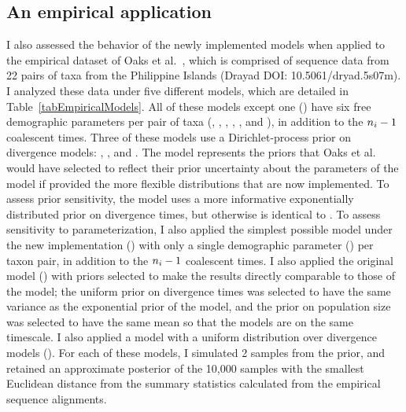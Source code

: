 \subsection{An empirical application}
I also assessed the behavior of the newly implemented models when applied to
the empirical dataset of Oaks et al.\ \cite{Oaks2012}, which is comprised of
sequence data from 22 pairs of taxa from the Philippine Islands (Drayad DOI:
10.5061/dryad.5s07m).
I analyzed these data under five different models, which are detailed in
Table~\ref{tabEmpiricalModels}.
All of these models except one (\empModelDPPSimple) have six free demographic
parameters per pair of taxa (\ancestralTheta{},
,
,
\bottleTime{},
, and
),
in addition to the $\popSampleSize{i}{} - 1$ coalescent times.
Three of these models use a Dirichlet-process prior on divergence models:
\empModelDPP, \empModelDPPInform, and \empModelDPPSimple.
The \empModelDPP model represents the priors that Oaks et al.\ \cite{Oaks2012}
would have selected to reflect their prior uncertainty about the parameters of
the model if provided the more flexible distributions that are now implemented.
To assess prior sensitivity, the \empModelDPPInform model uses a more
informative exponentially distributed prior on divergence times, but otherwise
is identical to \empModelDPP.
To assess sensitivity to parameterization, I also applied the simplest
possible model under the new implementation (\empModelDPPSimple) with only a
single demographic parameter (\myTheta{}) per taxon pair, in addition to the
$\popSampleSize{i}{} - 1$ coalescent times.
I also applied the original \msb model (\empModelOld) with priors selected to
make the results directly comparable to those of the \empModelDPP model;
the uniform prior on divergence times was selected to have the same variance as
the exponential prior of the \empModelDPP model, and the prior on population
size was selected to have the same mean so that the models are on the same
timescale.
I also applied a model with a uniform distribution over divergence models
(\empModelUniform).
For each of these models, I simulated 2 samples from the prior, and
retained an approximate posterior of the 10,000 samples with the smallest
Euclidean distance from the summary statistics calculated from the empirical
sequence alignments.

